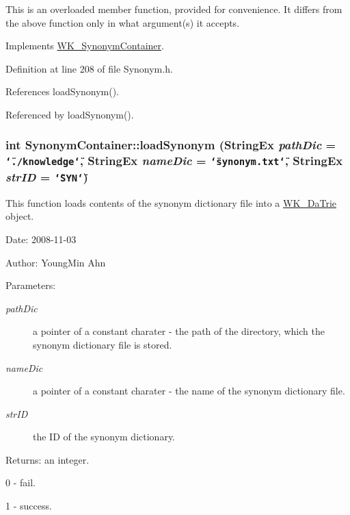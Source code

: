 This is an overloaded member function, provided for convenience. It differs from the above function only in what argument(s) it accepts. 

Implements \hyperlink{classWK__SynonymContainer_9e7ec0d46d3db686ef5b0d3b9719b96d}{WK\_\-SynonymContainer}.

Definition at line 208 of file Synonym.h.

References loadSynonym().

Referenced by loadSynonym().\hypertarget{classkmaOrange_1_1SynonymContainer_1d9f423be46ace7cad7a195ec33f7fac}{
\subsubsection[{loadSynonym}]{\setlength{\rightskip}{0pt plus 5cm}int SynonymContainer::loadSynonym ({\bf StringEx} {\em pathDic} = {\tt \char`\"{}./knowledge\char`\"{}}, \/  {\bf StringEx} {\em nameDic} = {\tt \char`\"{}synonym.txt\char`\"{}}, \/  {\bf StringEx} {\em strID} = {\tt \char`\"{}SYN\char`\"{}})}}
\label{classkmaOrange_1_1SynonymContainer_1d9f423be46ace7cad7a195ec33f7fac}


This function loads contents of the synonym dictionary file into a \hyperlink{classkmaOrange_1_1WK__DaTrie}{WK\_\-DaTrie} object. 

\begin{Desc}
\item[Date:]2008-11-03 \end{Desc}
\begin{Desc}
\item[Author:]YoungMin Ahn \end{Desc}
\begin{Desc}
\item[Parameters:]
\begin{description}
\item[{\em pathDic}]a pointer of a constant charater - the path of the directory, which the synonym dictionary file is stored. \item[{\em nameDic}]a pointer of a constant charater - the name of the synonym dictionary file. \item[{\em strID}]the ID of the synonym dictionary. \end{description}
\end{Desc}
\begin{Desc}
\item[Returns:]an integer.\par
 0 - fail.\par
 1 - success. \end{Desc}


